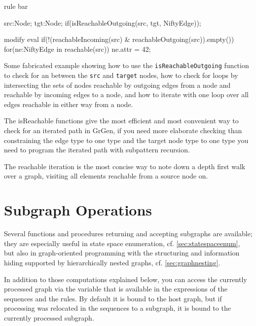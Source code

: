 \begin{example}
\begin{grgen}
rule bar {
    src:Node; 
    tgt:Node;
    if(isReachableOutgoing(src, tgt, NiftyEdge));
    
    modify {
        eval {
            if(!(reachableIncoming(src) & reachableOutgoing(src)).empty())
            {
                for(ne:NiftyEdge in reachable(src))
                {
                    ne.attr = 42;
                }
            }
        }
    }
}
\end{grgen}
Some fabricated example showing how to use the \texttt{isReachableOutgoing} function to check for an  between the \texttt{src} and \texttt{target} nodes, how to check for loops by intersecting the sets of nodes reachable by outgoing edges from a node and reachable by incoming edges to a node, and how to iterate with one loop over all edges reachable in either way from a node.

The isReachable functions give the most efficient and most convenient way to check for an iterated path in GrGen, if you need more elaborate checking than constraining the edge type to one type and the target node type to one type you need to program the iterated path with subpattern recursion.

The reachable iteration is the most concise way to note down a depth first walk over a graph, visiting all elements reachable from a source node on.
\end{example}

\section{Subgraph Operations}\label{sec:subgraphop}

Several functions and procedures returning and accepting subgraphs are available;
they are especially useful in state space enumeration, cf. \ref{sec:statespaceenum}, but also in graph-oriented programming with the structuring and information hiding supported by hierarchically nested graphs, cf. \ref{sec:graphnesting}.

In addition to those computations explained below, you can access the currently processed graph via the  \texttt{} variable that is available in the expressions of the sequences and the rules. 
By default it is bound to the host graph, but if processing was relocated in the sequences to a subgraph, it is bound to the currently processed subgraph.

